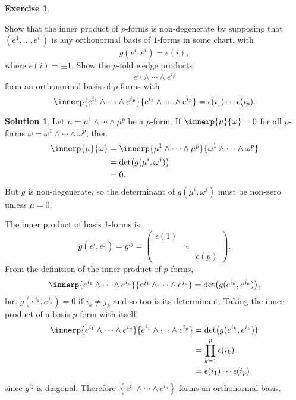 \documentclass[11pt, a4paper]{report}
\theoremstyle{definition}
\newtheorem{ex}{Exercise}[part]
\newtheorem{sol}{Solution}[part]
\begin{document}
\begin{ex}\label{ex:innerproductpforms}

Show that the inner product of $p$-forms is non-degenerate by supposing that $(e^1, \ldots, e^n)$ is any orthonormal basis of $1$-forms in some chart, with
\[
    g(e^i, e^i) = \epsilon(i),
\]
where $\epsilon(i) = \pm 1$. Show the $p$-fold wedge products
\[
    e^{i_1} \wedge \cdots \wedge e^{i_p}
\]
form an orthonormal basis of $p$-forms with
\[
    \innerp{e^{i_1} \wedge \cdots \wedge e^{i_p}}
           {e^{i_1} \wedge \cdots \wedge e^{i_p}}
        = \epsilon(i_1) \cdots \epsilon(i_p).
\]

\end{ex}

\begin{sol}

Let $\mu = \mu^1 \wedge \cdots \wedge \mu^p$ be a $p$-form. If $\innerp{\mu}{ \omega} = 0$ for all $p$-forms $\omega = \omega^1 \wedge \cdots \wedge \omega^p$, then
\begin{align*}
    \innerp{\mu}{\omega} &= \innerp{\mu^1 \wedge \cdots \wedge \mu^p}
                                   {\omega^1 \wedge \cdots \wedge \omega^p} \\
        &= \det \bigl( g(\mu^i, \omega^j) \bigr) \\
        &= 0.
\end{align*}
But $g$ is non-degenerate, so the determinant of $g(\mu^i, \omega^j)$ must be non-zero unless $\mu = 0$.

The inner product of basis 1-forms is
\[
    g(e^i, e^j) = g^{ij} = \begin{pmatrix}
            \epsilon(1) & & \\
            & \ddots & \\
            & & \epsilon(p)
        \end{pmatrix}.
\]
From the definition of the inner product of $p$-forms,
\[
    \innerp{e^{i_1} \wedge \cdots \wedge e^{i_p}}
           {e^{j_1} \wedge \cdots \wedge e^{j_p}}
        = \det \bigl( g(e^{i_k}, e^{j_k}) \bigr),
\]
but $g(e^{i_k}, e^{j_k}) = 0$ if $i_k \neq j_k$ and so too is its determinant.
Taking the inner product of a basis $p$-form with itself,
\begin{align*}
    \innerp{e^{i_1} \wedge \cdots \wedge e^{i_p}}
           {e^{i_1} \wedge \cdots \wedge e^{i_p}}
        &= \det \bigl( g(e^{i_k}, e^{i_k}) \bigr) \\
        &= \prod_{k = 1}^p \epsilon(i_k) \\
        &= \epsilon(i_1) \cdots \epsilon(i_p)
\end{align*}
since $g^{ij}$ is diagonal. Therefore $\left\{e^{i_1} \wedge \cdots \wedge e^{i_p}\right\}$ forms an orthonormal basis.

\end{sol}
\end{document}
